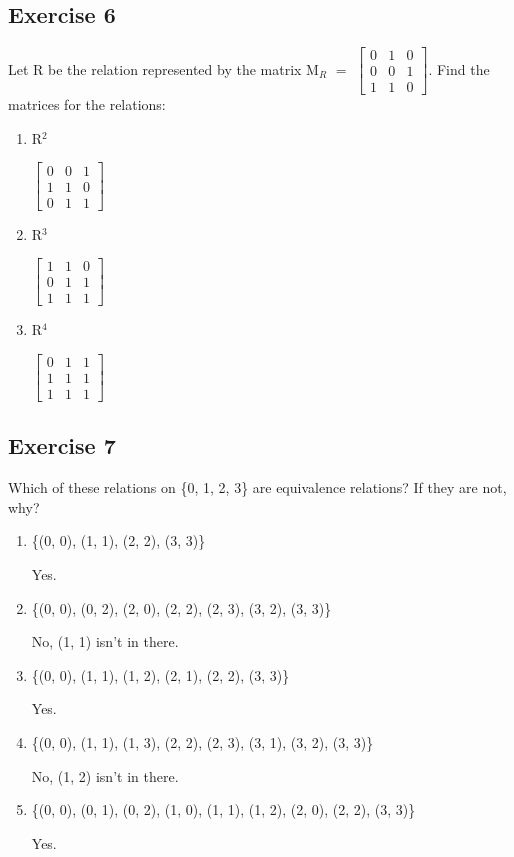 \documentclass{article}
\newcommand{\mt}[1]{\ensuremath{#1}}
\newcommand\ssc[2][\DefaultOpt]{%
  \def\DefaultOpt{#2}%
  \subsection[#1]{#2}%
}
\newcommand{\balist}{\begin{enumerate}[label=\alph*.]}
\newcommand{\elist}{\end{enumerate}}
\newcommand{\bk}[1]{\{#1\}}
\newcommand{\eql}{\mt{=} }
\newcommand{\uw}[2]{#1\mt{_{#2}}}
\newcommand{\uf}[2]{#1\mt{^{#2}}}
\begin{document}
\ssc{Exercise 6}{

Let R be the relation represented by the matrix \uw{M}{R} \eql \mt{\begin{bmatrix}{}
  0 & 1 & 0 \\
  0 & 0 & 1 \\
  1 & 1 & 0
\end{bmatrix}
}.
Find the matrices for the relations:

\balist
\item \uf{R}{2}

\mt{\begin{bmatrix}{}
  0 & 0 & 1 \\
  1 & 1 & 0 \\
  0 & 1 & 1
\end{bmatrix}
}

\item \uf{R}{3}

\mt{\begin{bmatrix}{}
  1 & 1 & 0 \\
  0 & 1 & 1 \\
  1 & 1 & 1
\end{bmatrix}
}

\item \uf{R}{4}

\mt{\begin{bmatrix}{}
  0 & 1 & 1 \\
  1 & 1 & 1 \\
  1 & 1 & 1
\end{bmatrix}
}

\elist

}

\ssc{Exercise 7}{

Which of these relations on \bk{0, 1, 2, 3} are equivalence relations? If they are not, why?

\balist 
\item \bk{(0, 0), (1, 1), (2, 2), (3, 3)}

Yes.

\item \bk{(0, 0), (0, 2), (2, 0), (2, 2), (2, 3), (3, 2), (3, 3)}

No, (1, 1) isn't in there.

\item \bk{(0, 0), (1, 1), (1, 2), (2, 1), (2, 2), (3, 3)}

Yes.

\item \bk{(0, 0), (1, 1), (1, 3), (2, 2), (2, 3), (3, 1), (3, 2), (3, 3)}

No, (1, 2) isn't in there.

\item \bk{(0, 0), (0, 1), (0, 2), (1, 0), (1, 1), (1, 2), (2, 0), (2, 2), (3, 3)}

Yes.

\elist 

}
\end{document}
